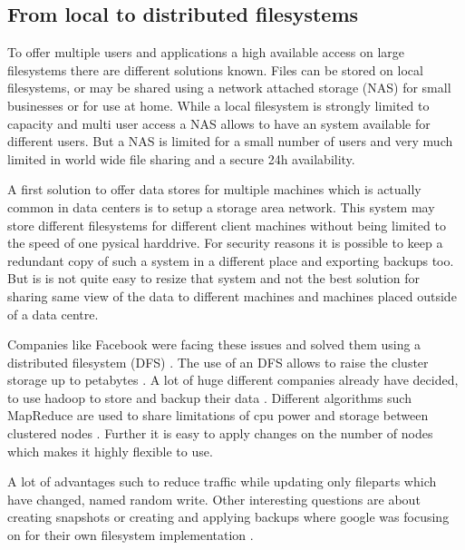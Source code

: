 \subsection{From local to distributed filesystems}


To offer multiple users and applications a high available access on large filesystems there are different solutions known. 
Files can be stored on local filesystems, or may be shared using a network attached storage (NAS) for small businesses or for use at home. 
While a local filesystem is strongly limited to capacity and multi user access a NAS allows to have an system available for different users. 
But a NAS is limited for a small number of users and very much limited in world wide file sharing and a secure 24h availability.

A first solution to offer data stores for multiple machines which is actually common in data centers is to setup a storage area network. 
This system may store different filesystems for different client machines without being limited to the speed of one pysical harddrive. 
For security reasons it is possible to keep a redundant copy of such a system in a different place and exporting backups too. 
But is is not quite easy to resize that system and not the best solution for sharing same view of the data to different machines and machines placed outside of a data centre.

Companies like Facebook were facing these issues and solved them using a distributed filesystem (DFS) \cite{fb-hadoop}. 
The use of an DFS allows to raise the cluster storage  up to petabytes  \cite{fb-hadoop}. 
A lot of huge different companies already have decided, to use hadoop to store and backup their data  \cite{hadoop-poweredby}. 
Different algorithms such MapReduce are used to share limitations of cpu power and storage between clustered nodes \cite{dean2008mapreduce}. 
Further it is easy to apply changes on the number of nodes which makes it highly flexible to use. 

A lot of advantages such to reduce traffic while updating only fileparts which have changed, named random write. 
Other interesting questions are about creating snapshots or creating and applying backups where google was focusing on for their own filesystem implementation \cite{ghemawat2003google}.



